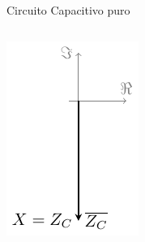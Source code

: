\documentclass[aspectratio=169, usenames,svgnames,dvipsnames]{beamer}
\begin{document}
\begin{frame}[label={sec:org08f1ffb}]{Circuito Capacitivo puro}
\begin{columns}
\begin{column}{0.3\columnwidth}
\begin{center}
\includegraphics[height=0.4\textheight]{../figs/fasorCondensador.pdf}
\end{center}
\end{column}
\end{columns}
\end{frame}
\end{document}
